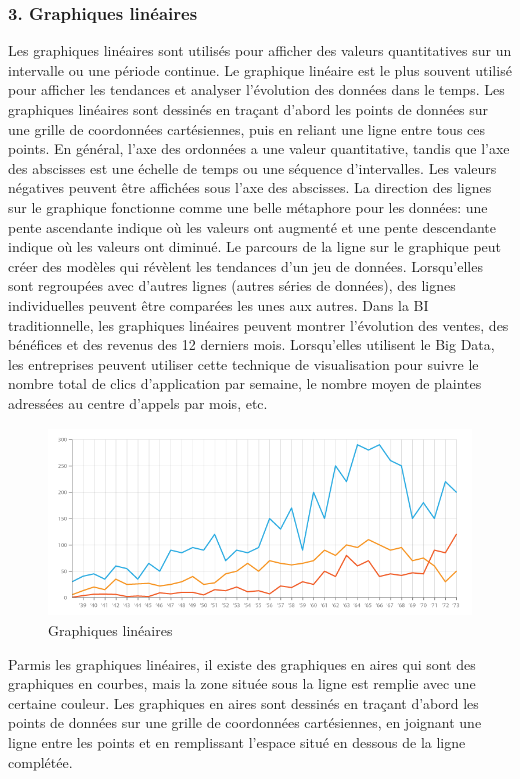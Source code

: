 \documentclass[french, a4paper, 12pt]{report}
\begin{document}
\subsubsection{3. Graphiques linéaires}
Les graphiques linéaires sont utilisés pour afficher des valeurs quantitatives sur un intervalle ou une période continue. Le graphique linéaire est le plus souvent utilisé pour afficher les tendances et analyser l’évolution des données dans le temps.
Les graphiques linéaires sont dessinés en traçant d'abord les points de données sur une grille de coordonnées cartésiennes, puis en reliant une ligne entre tous ces points. En général, l'axe des ordonnées a une valeur quantitative, tandis que l'axe des abscisses est une échelle de temps ou une séquence d'intervalles. Les valeurs négatives peuvent être affichées sous l'axe des abscisses.
La direction des lignes sur le graphique fonctionne comme une belle métaphore pour les données: une pente ascendante indique où les valeurs ont augmenté et une pente descendante indique où les valeurs ont diminué. Le parcours de la ligne sur le graphique peut créer des modèles qui révèlent les tendances d'un jeu de données.
Lorsqu'elles sont regroupées avec d'autres lignes (autres séries de données), des lignes individuelles peuvent être comparées les unes aux autres. 
Dans la BI traditionnelle, les graphiques linéaires peuvent montrer l'évolution des ventes, des bénéfices et des revenus des 12 derniers mois. Lorsqu'elles utilisent le Big Data, les entreprises peuvent utiliser cette technique de visualisation pour suivre le nombre total de clics d'application par semaine, le nombre moyen de plaintes adressées au centre d'appels par mois, etc.
\begin{figure}[!ht]
    \centering
    \includegraphics[height=5cm]{images/line_graph.png}
    \caption{Graphiques linéaires}
    \label{fig:2.5}
\end{figure}
Parmis les graphiques linéaires, il existe des graphiques en aires qui sont des graphiques en courbes, mais la zone située sous la ligne est remplie avec une certaine couleur. Les graphiques en aires sont dessinés en traçant d'abord les points de données sur une grille de coordonnées cartésiennes, en joignant une ligne entre les points et en remplissant l'espace situé en dessous de la ligne complétée.
\end{document}
